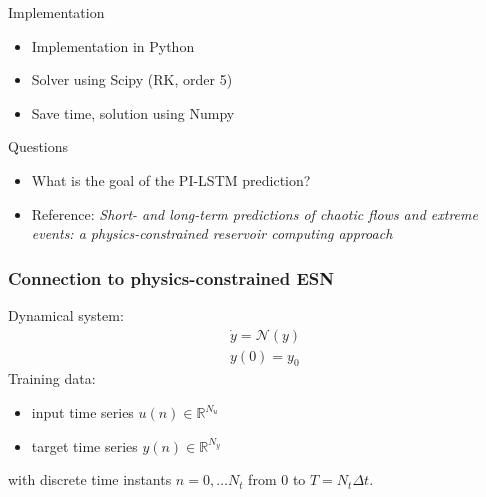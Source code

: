 \documentclass{beamer}
\begin{document}
\begin{frame}{Implementation}
\begin{itemize}
    \item Implementation in Python
    \item Solver using Scipy (RK, order 5)
    \item Save time, solution using Numpy
\end{itemize}
\end{frame}


\begin{frame}{Questions}
\begin{itemize}
    \item What is the goal of the PI-LSTM prediction? 
     \item Reference: \textit{Short- and long-term predictions of chaotic flows and extreme events: a physics-constrained reservoir computing approach}

    
\end{itemize}
    
\end{frame}
\begin{frame}
	\frametitle{Connection to physics-constrained ESN}
Dynamical system:
\begin{align}
    &\dot{y} = \mathcal{N}(y) \\
    & y(0) = y_0
\end{align}
\pause
Training data:
\begin{itemize}

    \item input time series $u(n) \in \mathbb{R}^{N_u}$
    \item target time series $y(n) \in \mathbb{R}^{N_y}$
\end{itemize}
with discrete time instants $n=0, \dots N_t$ from $0$ to $T=N_t\Delta t$.
\end{frame}
\end{document}
